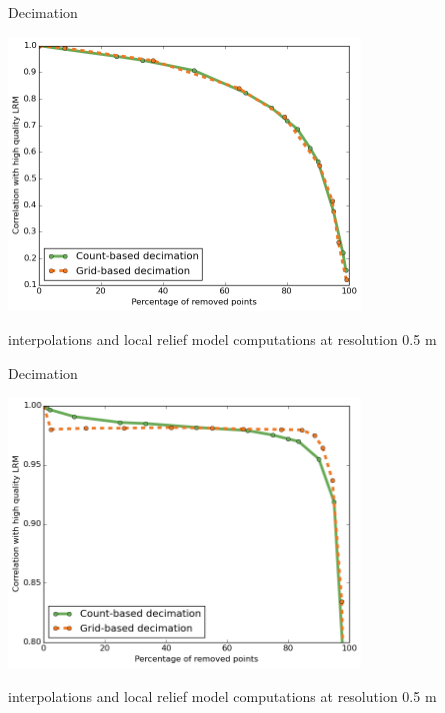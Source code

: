 \documentclass[xcolor={dvipsnames,usenames},beamer,aspectratio=43]{beamer}
\begin{document}
\begin{frame}{Decimation}

\begin{center}
\includegraphics[width=0.7\textwidth]{decimation/lrm_grid_count_lidar}

\end{center}

interpolations and
local relief model computations at resolution 0.5 m

\end{frame}

\begin{frame}{Decimation}

\begin{center}

\includegraphics[width=0.7\textwidth]{decimation/lrm_grid_count_uav}

\end{center}

interpolations and
local relief model computations at resolution 0.5 m

\end{frame}
\end{document}
